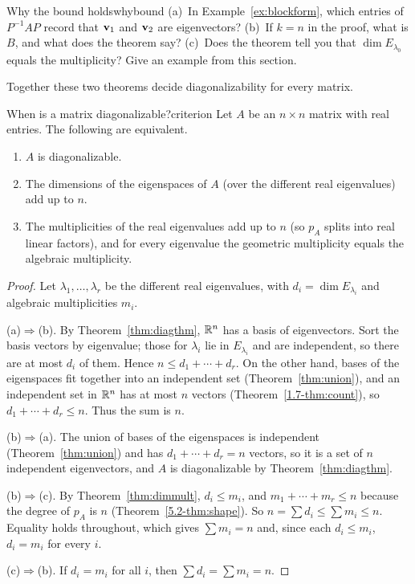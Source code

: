 \documentclass[11pt]{article}
\begin{document}
\begin{think}{Why the bound holds}{whybound}
(a)~In Example~\ref{ex:blockform}, which entries of $P^{-1}AP$ record that $\mathbf{v}_1$ and $\mathbf{v}_2$ are eigenvectors? (b)~If $k=n$ in the proof, what is $B$, and what does the theorem say? (c)~Does the theorem tell you that $\dim E_{\lambda_0}$ equals the multiplicity? Give an example from this section.
\end{think}

Together these two theorems decide diagonalizability for every matrix.

\begin{thm}{When is a matrix diagonalizable?}{criterion}
Let $A$ be an $n\times n$ matrix with real entries. The following are equivalent.
\begin{enumerate}[label=(\alph*),itemsep=1pt]
  \item $A$ is diagonalizable.
  \item The dimensions of the eigenspaces of $A$ (over the different real eigenvalues) add up to $n$.
  \item The multiplicities of the real eigenvalues add up to $n$ (so $p_A$ splits into real linear factors), and for every eigenvalue the geometric multiplicity equals the algebraic multiplicity.
\end{enumerate}
\end{thm}

\begin{proof}
Let $\lambda_1,\dots,\lambda_r$ be the different real eigenvalues, with $d_i=\dim E_{\lambda_i}$ and algebraic multiplicities $m_i$.

(a)$\Rightarrow$(b). By Theorem~\ref{thm:diagthm}, $\mathbb{R}^n$ has a basis of eigenvectors. Sort the basis vectors by eigenvalue; those for $\lambda_i$ lie in $E_{\lambda_i}$ and are independent, so there are at most $d_i$ of them. Hence $n\le d_1+\cdots+d_r$. On the other hand, bases of the eigenspaces fit together into an independent set (Theorem~\ref{thm:union}), and an independent set in $\mathbb{R}^n$ has at most $n$ vectors (Theorem~\ref{1.7-thm:count}), so $d_1+\cdots+d_r\le n$. Thus the sum is $n$.

(b)$\Rightarrow$(a). The union of bases of the eigenspaces is independent (Theorem~\ref{thm:union}) and has $d_1+\cdots+d_r=n$ vectors, so it is a set of $n$ independent eigenvectors, and $A$ is diagonalizable by Theorem~\ref{thm:diagthm}.

(b)$\Rightarrow$(c). By Theorem~\ref{thm:dimmult}, $d_i\le m_i$, and $m_1+\cdots+m_r\le n$ because the degree of $p_A$ is $n$ (Theorem~\ref{5.2-thm:shape}). So $n=\sum d_i\le\sum m_i\le n$. Equality holds throughout, which gives $\sum m_i=n$ and, since each $d_i\le m_i$, $d_i=m_i$ for every $i$.

(c)$\Rightarrow$(b). If $d_i=m_i$ for all $i$, then $\sum d_i=\sum m_i=n$.
\end{proof}
\end{document}
